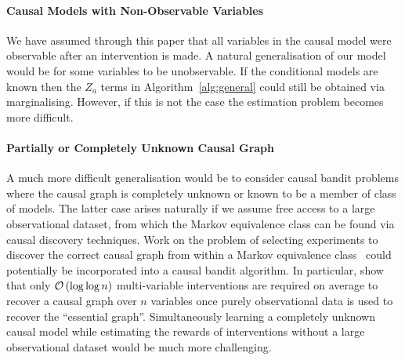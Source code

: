 \paragraph{Causal Models with Non-Observable Variables}
We have assumed through this paper that all variables in the causal model were observable after an intervention is made.
A natural generalisation of our model would be for some variables to be unobservable.
If the conditional models are known then the $Z_a$ terms in Algorithm~\ref{alg:general} could still be obtained via marginalising.
However, if this is not the case the estimation problem becomes more difficult.




\paragraph{Partially or Completely Unknown Causal Graph}
A much more difficult generalisation would be to consider causal bandit problems where the causal graph is completely unknown or known to be a member of class of models.
The latter case arises naturally if we assume free access to a large observational dataset, from which the Markov equivalence class can be found via causal discovery techniques. 
Work on the problem of selecting experiments to discover the correct causal graph from within a Markov equivalence class~\cite{Eberhardt2005,eberhardt2010causal,hauser2014two,Hu2014b} could potentially be incorporated into a causal bandit algorithm.
In particular, \citet{Hu2014b} show that only $\mathcal{O}\left( \log \log n \right)$ multi-variable interventions are required on average to recover a causal graph over $n$ variables once purely observational data is used to recover the ``essential graph''.
Simultaneously learning a completely unknown causal model while estimating the rewards of interventions without a large observational dataset would be much more challenging.


